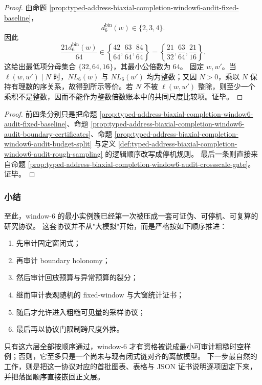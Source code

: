\begin{proof}
由命题 \ref{prop:typed-address-biaxial-completion-window6-audit-fixed-baseline}，
\[
d_6^{\mathrm{bin}}(w)\in\{2,3,4\}.
\]
因此
\[
\frac{21d_6^{\mathrm{bin}}(w)}{64}\in
\left\{\frac{42}{64},\frac{63}{64},\frac{84}{64}\right\}
=
\left\{\frac{21}{32},\frac{63}{64},\frac{21}{16}\right\}.
\]
这给出最低项分母集合 \(\{32,64,16\}\)，其最小公倍数为 \(64\)。
固定 \(w,w'\)。当 \(\ell(w,w')\mid N\) 时，\(NL_6(w)\) 与 \(NL_6(w')\) 均为整数；又因 \(N>0\)，乘以 \(N\) 保持有理数的序关系，故得到所示等价。若 \(N\) 不被 \(\ell(w,w')\) 整除，则至少一个乘积不是整数，因而不能作为整数倍数账本中的共同尺度比较项。证毕。
\end{proof}

\begin{proof}
前四条分别只是把命题 \ref{prop:typed-address-biaxial-completion-window6-audit-fixed-baseline}、命题 \ref{prop:typed-address-biaxial-completion-window6-audit-boundary-certificates}、命题 \ref{prop:typed-address-biaxial-completion-window6-audit-budget-split} 与定义 \ref{def:typed-address-biaxial-completion-window6-audit-rough-sampling} 的逻辑顺序改写成停机规则。
最后一条则直接来自命题 \ref{prop:typed-address-biaxial-completion-window6-audit-crossscale-gate}。证毕。
\end{proof}

\subsubsection{小结}\label{subsubsec:typed-address-biaxial-completion-window6-numerical-audit-summary}
至此，window-\(6\) 的最小实例簇已经第一次被压成一套可证伪、可停机、可复算的研究协议。
这套协议并不从"大模拟"开始，而是严格按如下顺序推进：
\begin{enumerate}
  \item 先审计固定窗闭式；
  \item 再审计 boundary holonomy；
  \item 然后审计回放预算与异常预算的裂分；
  \item 继而审计表观随机的 fixed-window 与大窗统计证书；
  \item 随后才允许进入粗糙可见量的采样协议；
  \item 最后再以协议门限制跨尺度外推。
\end{enumerate}
只有这六层全部按顺序通过，window-\(6\) 才有资格被说成最小可审计粗糙时空样例；否则，它至多只是一个尚未与现有闭式链对齐的离散模型。
下一步最自然的工作，则是把这一协议对应的首批图表、表格与 JSON 证书说明逐项固定下来，并把落图顺序直接嵌回正文层。
